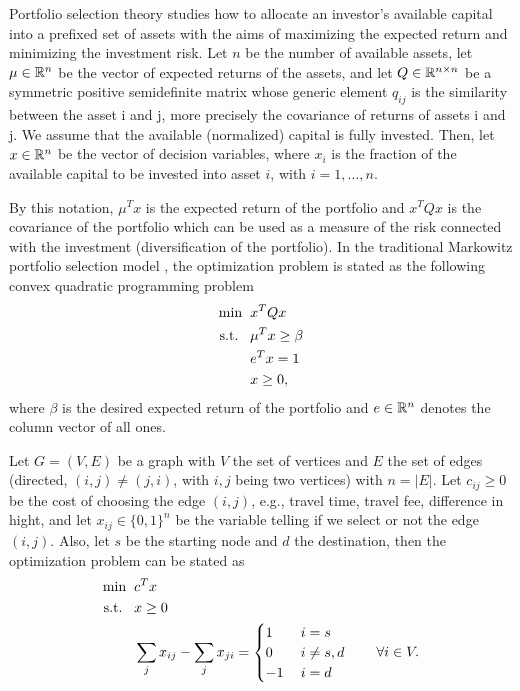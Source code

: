 \documentclass[10pt,a4paper]{article}
\begin{document}
\begin{example} Portfolio selection theory studies how to allocate an investor’s available capital into a prefixed set of assets with the aims of maximizing the expected return and minimizing the investment risk. Let $n$ be the number of available assets, let $\mu\in \mathbb{R}^n$ be the vector of expected returns of the assets, and let $Q \in \mathbb{R}^{n\times n}$ be a symmetric positive semidefinite matrix whose generic element $q_{ij}$ is the similarity between the asset i and j, more precisely the covariance of returns of assets i and j. We assume that the available (normalized) capital is fully invested. Then, let $x \in \mathbb{R}^n$ be the vector of decision variables, where $x_i$ is the fraction of the available capital to be invested into asset $i$, with $i = 1, \dots, n$. 
\par By this notation, $\mu^T x$ is the expected return of the portfolio and $x^TQx$ is the covariance of the portfolio which
can be used as a measure of the risk connected with the investment (diversification of the portfolio). 
In the traditional Markowitz portfolio selection model \cite{markowits52a}, the optimization problem is stated as the following convex quadratic programming problem
\begin{equation*}
	\begin{split}
		\min \;\; &x^TQx\\
		\text{s.t.} \;\;\;& \mu^Tx\geq \beta \\
		& e^Tx =1\\
		& x\geq 0,
	\end{split}
\end{equation*}
where $\beta$ is the desired expected return of the portfolio and $e\in \mathbb{R}^n$ denotes the column vector of all ones.
\end{example}
\begin{example} Let $G=(V,E)$ be a graph with $V$ the set of vertices and $E$ the set of edges (directed, $(i,j)\neq(j,i)$, with $i,j$ being two vertices) with $n=|E|$. Let $c_{ij}\geq0$ be the cost of choosing the edge $(i,j)$, e.g., travel time, travel fee, difference in hight, and let $x_{ij}\in \{0,1\}^{n}$ be the variable telling if we select or not the edge $(i,j)$. Also, let $s$ be the starting node and $d$ the destination, then the optimization problem can be stated as
\begin{equation*}
	\begin{split}
		\min \;\; &c^Tx\\
		\text{s.t.} \;\;\;& x\geq 0\\
		& \sum_{j} x_{ij} - \sum_{j} x_{ji} = \begin{cases}1 \quad & i=s\\
			0 & i\neq s,d\\
			-1 & i=d
		\end{cases} \qquad \forall i \in V.
	\end{split}
\end{equation*}
\end{example}
\end{document}
